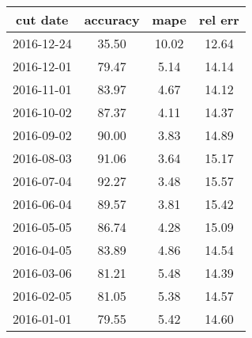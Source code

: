 \begin{tabular}{cccc}
\toprule
  \textbf{cut date} & \textbf{accuracy} & \textbf{mape} & \textbf{rel err} \\
\midrule
2016-12-24 &             35.50 &         10.02 &            12.64 \\
2016-12-01 &             79.47 &          5.14 &            14.14 \\
2016-11-01 &             83.97 &          4.67 &            14.12 \\
2016-10-02 &             87.37 &          4.11 &            14.37 \\
2016-09-02 &             90.00 &         3.83 &             14.89 \\
2016-08-03 &             91.06 &          3.64 &            15.17 \\
2016-07-04 &             92.27 &          3.48 &            15.57 \\
2016-06-04 &             89.57 &          3.81 &            15.42 \\
2016-05-05 &             86.74 &          4.28 &            15.09 \\
2016-04-05 &             83.89 &          4.86 &            14.54 \\
2016-03-06 &             81.21 &          5.48 &            14.39 \\
2016-02-05 &             81.05 &          5.38 &            14.57 \\
2016-01-01 &             79.55 &          5.42 &            14.60 \\
\bottomrule
\end{tabular}
